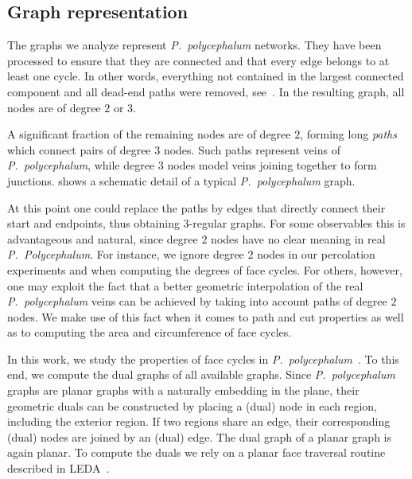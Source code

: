 	\subsection{Graph representation}

		The graphs we analyze represent \emph{P.~polycephalum} networks. They have been processed to ensure that they are connected and that every edge belongs to at least one cycle. In other words, everything not contained in the largest connected component and all dead-end paths were removed, see~\cite{SMGR}. In the resulting graph, all nodes are of degree $2$ or $3$.

		A significant fraction of the remaining nodes are of degree $2$, forming long \emph{paths} which connect pairs of degree $3$ nodes. Such paths represent veins of \emph{P.~polycephalum}, while degree $3$ nodes model veins joining together to form junctions.  shows a schematic detail of a typical \emph{P.~polycephalum} graph.

		At this point one could replace the paths by edges that directly connect their start and endpoints, thus obtaining $3$-regular graphs. For some observables this is advantageous and natural, since degree $2$ nodes have no clear meaning in real \emph{P.~Polycephalum}. For instance, we ignore degree $2$ nodes in our percolation experiments and when computing the degrees of face cycles. For others, however, one may exploit the fact that a better geometric interpolation of the real \emph{P.~polycephalum} veins can be achieved by taking into account paths of degree $2$ nodes. We make use of this fact when it comes to path and cut properties as well as to computing the area and circumference of face cycles.

		In this work, we study the properties of face cycles in \emph{P.~polycephalum}~\cite{mehlhorn1995leda}. To this end, we compute the dual graphs of all available graphs. Since \emph{P.~polycephalum} graphs are planar graphs with a naturally embedding in the plane, their geometric duals can be constructed by placing a (dual) node in each region, including the exterior region. If two regions share an edge, their corresponding (dual) nodes are joined by an (dual) edge. The dual graph of a planar graph is again planar. To compute the duals we rely on a planar face traversal routine described in LEDA~\cite{mehlhorn1995leda}.

